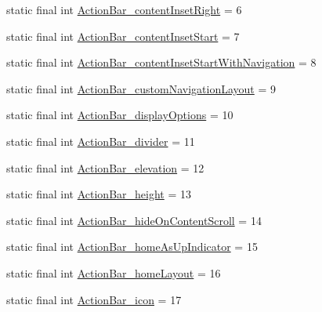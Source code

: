 \begin{DoxyCompactItemize}
\item 
static final int \mbox{\hyperlink{classandroid_1_1support_1_1v7_1_1appcompat_1_1_r_1_1styleable_a90365759317426c16fea29e9f94cf640}{Action\+Bar\+\_\+content\+Inset\+Right}} = 6
\item 
static final int \mbox{\hyperlink{classandroid_1_1support_1_1v7_1_1appcompat_1_1_r_1_1styleable_a90469b6f87b59c8dce99d18a41473aaa}{Action\+Bar\+\_\+content\+Inset\+Start}} = 7
\item 
static final int \mbox{\hyperlink{classandroid_1_1support_1_1v7_1_1appcompat_1_1_r_1_1styleable_a965cd5876f7586c6116d5994c8b78d86}{Action\+Bar\+\_\+content\+Inset\+Start\+With\+Navigation}} = 8
\item 
static final int \mbox{\hyperlink{classandroid_1_1support_1_1v7_1_1appcompat_1_1_r_1_1styleable_a479034d663c80b9d43c1e57e05a13c12}{Action\+Bar\+\_\+custom\+Navigation\+Layout}} = 9
\item 
static final int \mbox{\hyperlink{classandroid_1_1support_1_1v7_1_1appcompat_1_1_r_1_1styleable_acd03841811ba9e5df62a20bedb147162}{Action\+Bar\+\_\+display\+Options}} = 10
\item 
static final int \mbox{\hyperlink{classandroid_1_1support_1_1v7_1_1appcompat_1_1_r_1_1styleable_aa53b0e506f1634ced14e79cf6f24ebee}{Action\+Bar\+\_\+divider}} = 11
\item 
static final int \mbox{\hyperlink{classandroid_1_1support_1_1v7_1_1appcompat_1_1_r_1_1styleable_ae947136b9e457a332a3eb65704d7ba19}{Action\+Bar\+\_\+elevation}} = 12
\item 
static final int \mbox{\hyperlink{classandroid_1_1support_1_1v7_1_1appcompat_1_1_r_1_1styleable_afcf0c640109d8f4d07f74682d413401f}{Action\+Bar\+\_\+height}} = 13
\item 
static final int \mbox{\hyperlink{classandroid_1_1support_1_1v7_1_1appcompat_1_1_r_1_1styleable_aed9672fa4e0265f2aacd9a7d5aeadc72}{Action\+Bar\+\_\+hide\+On\+Content\+Scroll}} = 14
\item 
static final int \mbox{\hyperlink{classandroid_1_1support_1_1v7_1_1appcompat_1_1_r_1_1styleable_a618dbd8bf94ca7c36621ee8e90c82fb3}{Action\+Bar\+\_\+home\+As\+Up\+Indicator}} = 15
\item 
static final int \mbox{\hyperlink{classandroid_1_1support_1_1v7_1_1appcompat_1_1_r_1_1styleable_abd6457607a6085c532b81e0ed9056f48}{Action\+Bar\+\_\+home\+Layout}} = 16
\item 
static final int \mbox{\hyperlink{classandroid_1_1support_1_1v7_1_1appcompat_1_1_r_1_1styleable_a7361ca8600dde9887462a8f6d7d44a0a}{Action\+Bar\+\_\+icon}} = 17

\end{DoxyCompactItemize}

